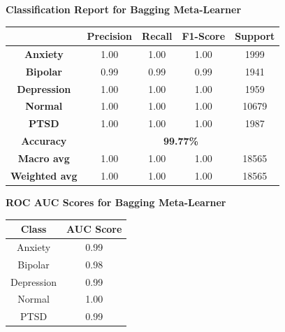 \begin{center}
    \textbf{Classification Report for Bagging Meta-Learner} \\[0.5em]
    \begin{tabular}{|c|c|c|c|c|}
        \hline
        & \textbf{Precision} & \textbf{Recall} & \textbf{F1-Score} & \textbf{Support} \\ \hline
        \textbf{Anxiety}    & 1.00 & 1.00 & 1.00 & 1999 \\ \hline
        \textbf{Bipolar}    & 0.99 & 0.99 & 0.99 & 1941 \\ \hline
        \textbf{Depression} & 1.00 & 1.00 & 1.00 & 1959 \\ \hline
        \textbf{Normal}     & 1.00 & 1.00 & 1.00 & 10679 \\ \hline
        \textbf{PTSD}       & 1.00 & 1.00 & 1.00 & 1987 \\ \hline
        \textbf{Accuracy}   & \multicolumn{4}{c|}{\textbf{99.77\%}} \\ \hline
        \textbf{Macro avg}  & 1.00 & 1.00 & 1.00 & 18565 \\ \hline
        \textbf{Weighted avg} & 1.00 & 1.00 & 1.00 & 18565 \\ \hline
    \end{tabular}
\end{center}

\begin{center}
    \textbf{ROC AUC Scores for Bagging Meta-Learner} \\[0.5em]
    \begin{tabular}{|c|c|}
        \hline
        \textbf{Class} & \textbf{AUC Score} \\ \hline
        Anxiety        & 0.99 \\ \hline
        Bipolar        & 0.98 \\ \hline
        Depression     & 0.99 \\ \hline
        Normal         & 1.00 \\ \hline
        PTSD           & 0.99 \\ \hline
    \end{tabular}
\end{center}

